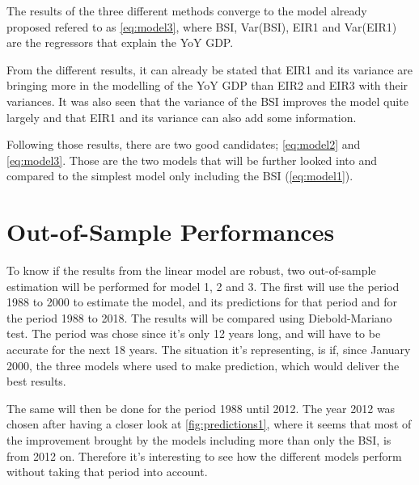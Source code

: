 \documentclass[12pt,a4paper,oneside]{book}
\begin{document}
The results of the three different methods converge to the model already proposed refered to as \ref{eq:model3}, where BSI, Var(BSI), EIR1 and Var(EIR1) are the regressors that explain the YoY GDP.

From the different results, it can already be stated that EIR1 and its variance are bringing more in the modelling of the YoY GDP than EIR2 and EIR3 with their variances.
It was also seen that the variance of the BSI improves the model quite largely and that EIR1 and its variance can also add some information.

Following those results, there are two good candidates; \autoref{eq:model2} and \ref{eq:model3}. Those are the two models that will be further looked into and compared to the simplest model only including the BSI (\autoref{eq:model1}).


\section{Out-of-Sample Performances}

To know if the results from the linear model are robust, two out-of-sample estimation will be performed for model 1, 2 and 3.
The first will use the period 1988 to 2000 to estimate the model, and its predictions for that period and for the period 1988 to 2018. The results will be compared using Diebold-Mariano test.
The period was chose since it's only 12 years long, and will have to be accurate for the next 18 years. The situation it's representing, is if, since January 2000, the three models where used to make prediction, which would deliver the best results.


The same will then be done for the period 1988 until 2012. The year 2012 was chosen after having a closer look at \autoref{fig:predictions1}, where it seems that most of the improvement brought by the models including more than only the BSI, is from 2012 on. Therefore it's interesting to see how the different models perform without taking that period into account.

\end{document}

